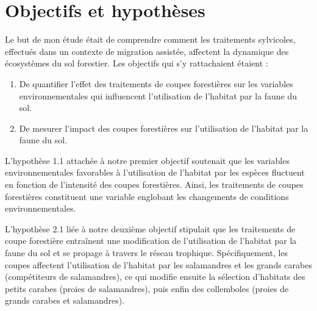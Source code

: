 \section*{Objectifs et hypothèses}
\label{sec:objectifs}

Le but de mon étude était de comprendre comment les traitements sylvicoles, effectués dans un contexte de migration assistée, 
affectent la dynamique des écosystèmes du sol forestier. Les objectifs qui s’y rattachaient étaient :

\begin{enumerate}
    \item De quantifier l'effet des traitements de coupes forestières sur les variables environnementales qui influencent l'utilisation de l'habitat par la faune du sol.
    \item De mesurer l'impact des coupes forestières sur l'utilisation de l'habitat par la faune du sol.
\end{enumerate}

L'hypothèse 1.1 attachée à notre premier objectif soutenait que les variables environnementales favorables à l'utilisation de l'habitat par les espèces fluctuent 
en fonction de l'intensité des coupes forestières. Ainsi, les traitements de coupes forestières constituent une variable englobant 
les changements de conditions environnementales.

L'hypothèse 2.1 liée à notre deuxième objectif stipulait que les traitements de coupe forestière entraînent une modification de l'utilisation de l'habitat 
par la faune du sol et se propage à travers le réseau trophique. Spécifiquement, les coupes affectent l'utilisation de l'habitat par les salamandres et 
les grands carabes (compétiteurs de salamandres), ce qui modifie ensuite la sélection d'habitats des petits carabes (proies de salamandres), puis enfin des collemboles (proies de grands carabes et salamandres).



\cleardoublepage



